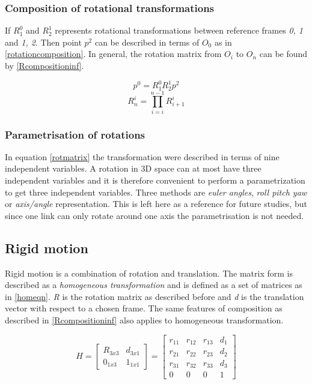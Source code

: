 \subsubsection{Composition of rotational transformations}

If $R^0_1$ and $R^1_2$ represents rotational transformations between reference frames \textit{0, 1} and \textit{1, 2}. Then point $p^2$ can be described in terms of $O_0$ as in \eqref{rotationcomposition}. In general, the rotation matrix from $O_i$ to $O_n$ can be found by \eqref{Rcompositioninf}.

\begin{equation}\label{rotationcomposition}
p^0 = R^0_1 R^1_2 p^2
\end{equation}
\vspace{-0.4cm}
\begin{equation}\label{Rcompositioninf}
R^i_n = \prod_{i=i}^{n-1} R^i_{i+1}
\end{equation}


\subsubsection{Parametrisation of rotations}

In equation \eqref{rotmatrix} the transformation were described in terms of nine independent variables. A rotation in 3D space can at most have three independent variables and it is therefore convenient to perform a parametrization to get three independent variables. Three methods are \textit{euler angles}, \textit{roll pitch yaw} or \textit{axis/angle} representation. This is left here as a reference for future studies, but since one link can only rotate around one axis the parametrisation is not needed.

\subsection{Rigid motion}

Rigid motion is a combination of rotation and translation. The matrix form is described as a \textit{homogeneous transformation} and is defined as a set of matrices as in \eqref{homeqn}. \textit{R} is the rotation matrix as described before and \textit{d} is the translation vector with respect to a chosen frame. The same features of composition as described in \eqref{Rcompositioninf} also applies to homogeneous transformation.

\begin{equation}\label{homeqn}
H = \begin{bmatrix}
R_{3x3} & d_{3x1}\\ 
0_{1x3} & 1_{1x1}
\end{bmatrix}=\begin{bmatrix}
r_{11} & r_{12} & r_{13} & d_{1}\\ 
r_{21} & r_{22} & r_{23} & d_{2}\\ 
r_{31} & r_{32} & r_{33} & d_{3}\\ 
0 & 0 & 0 & 1
\end{bmatrix}
\end{equation}


